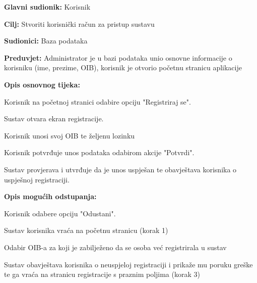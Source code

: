 					\noindent {}
					\begin{packed_item}
	
						\item \textbf{Glavni sudionik: }Korisnik
						\item  \textbf{Cilj:} Stvoriti korisnički račun za pristup sustavu
						\item  \textbf{Sudionici:} Baza podataka
						\item  \textbf{Preduvjet:} Administrator je u bazi podataka unio osnovne informacije o korisniku (ime, prezime, OIB), korisnik je otvorio početnu stranicu aplikacije
						\item  \textbf{Opis osnovnog tijeka:}
						
						\item[] \begin{packed_enum}
	
							\item Korisnik na početnoj stranici odabire opciju "Registriraj se".
							\item Sustav otvara ekran registracije.
							\item Korisnik unosi svoj OIB te željenu lozinku
							\item Korisnik potvrđuje unos podataka odabirom akcije "Potvrdi".
							\item Sustav provjerava i utvrđuje da je unos uspješan te obavještava korisnika o uspješnoj registraciji.
						\end{packed_enum}
						
						\item  \textbf{Opis mogućih odstupanja:}
						
						\item[] \begin{packed_item}
	
							\item[4.a] Korisnik odabere opciju "Odustani".
							\item[] \begin{packed_enum}
								
								\item Sustav korisnika vraća na početnu stranicu (korak 1)
								
								
							\end{packed_enum}
							
							\item[5.a] Odabir OIB-a za koji je zabilježeno da se osoba već registrirala u sustav
							\item[] \begin{packed_enum}
								
								\item Sustav obavještava korisnika o neuspjeloj registraciji i prikaže mu poruku greške te ga vraća na stranicu registracije s praznim poljima (korak 3)
								
								
							\end{packed_enum}
							
							
						\end{packed_item}
					\end{packed_item}
					
